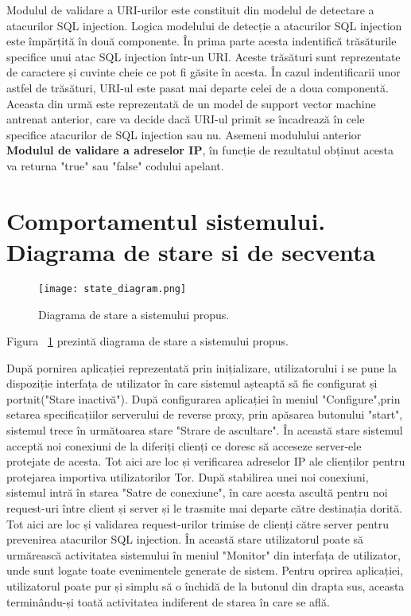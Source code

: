 Modulul de validare a URI-urilor este constituit din modelul de detectare a atacurilor SQL injection. Logica modelului de detecție a atacurilor SQL injection este împărțită în două componente. În prima parte acesta indentifică trăsăturile specifice unui atac SQL injection într-un URI. Aceste trăsături sunt reprezentate de caractere și cuvinte cheie ce pot fi găsite în acesta. În cazul indentificarii unor astfel de trăsături, URI-ul este pasat mai departe celei de a doua componentă. Aceasta din urmă este reprezentată de un model de support vector machine antrenat anterior, care va decide dacă URI-ul primit se încadrează în cele specifice atacurilor de SQL injection sau nu. Asemeni modulului anterior \textbf{Modulul de validare a adreselor IP}, în funcție de rezultatul obținut acesta va returna "true" sau "false" codului apelant. 

\section{Comportamentul sistemului. Diagrama de stare si de secventa}
\begin{figure}[h]
	\centering
	\texttt{[image: state\_diagram.png]}
	\caption{Diagrama de stare a sistemului propus.}
	\label{fig:state}
\end{figure}
Figura ~\ref{fig:state} prezintă diagrama de stare a sistemului propus.

După pornirea aplicației reprezentată prin inițializare, utilizatorului i se pune la dispoziție interfața de utilizator în care sistemul așteaptă să fie configurat și portnit("Stare inactivă"). După configurarea aplicației în meniul "Configure",prin setarea specificațiilor serverului de reverse proxy, prin apăsarea butonului "start", sistemul trece în următoarea stare "Strare de ascultare". În această stare sistemul acceptă noi conexiuni de la diferiți clienți ce doresc să acceseze server-ele protejate de acesta. Tot aici are loc și verificarea adreselor IP ale clienților pentru protejarea importiva utilizatorilor Tor. După stabilirea unei noi conexiuni, sistemul intră în starea "Satre de conexiune", în care acesta ascultă pentru noi request-uri între client și server și le trasmite mai departe către destinația dorită. Tot aici are loc și validarea request-urilor trimise de clienți către server pentru prevenirea atacurilor SQL injection. În această stare utilizatorul poate să urmărească activitatea sistemului în meniul "Monitor" din interfața de utilizator, unde sunt logate toate evenimentele generate de sistem. Pentru oprirea aplicației, utilizatorul poate pur și simplu să o închidă de la butonul din drapta sus, aceasta terminându-și toată activitatea indiferent de starea în care se află. 


